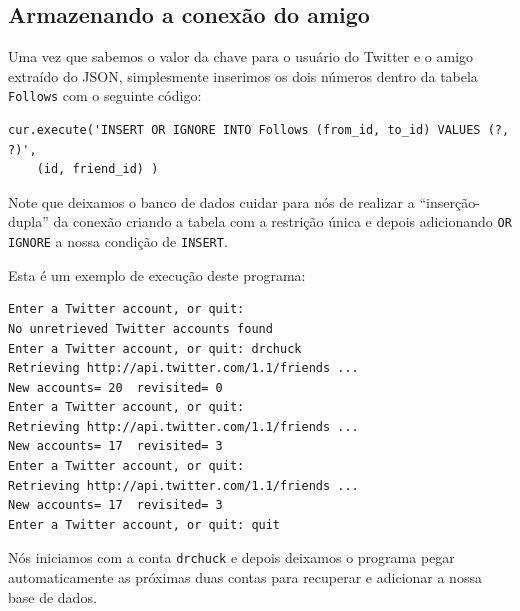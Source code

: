 \subsection{Armazenando a conexão do amigo}


Uma vez que sabemos o valor da chave para o usuário do Twitter e o amigo
extraído do JSON, simplesmente inserimos os dois números dentro da tabela
{\tt Follows} com o seguinte código:

\beforeverb
\begin{verbatim}
cur.execute('INSERT OR IGNORE INTO Follows (from_id, to_id) VALUES (?, ?)',
    (id, friend_id) )
\end{verbatim}
\afterverb
%
%
Note que deixamos o banco de dados cuidar para nós de realizar a
``inserção-dupla'' da conexão criando a tabela com a restrição única e depois
adicionando {\tt OR IGNORE} a nossa condição de {\tt INSERT}.

Esta é um exemplo de execução deste programa:

\beforeverb
\begin{verbatim}
Enter a Twitter account, or quit: 
No unretrieved Twitter accounts found
Enter a Twitter account, or quit: drchuck
Retrieving http://api.twitter.com/1.1/friends ...
New accounts= 20  revisited= 0
Enter a Twitter account, or quit: 
Retrieving http://api.twitter.com/1.1/friends ...
New accounts= 17  revisited= 3
Enter a Twitter account, or quit: 
Retrieving http://api.twitter.com/1.1/friends ...
New accounts= 17  revisited= 3
Enter a Twitter account, or quit: quit
\end{verbatim}
\afterverb
%

%
Nós iniciamos com a conta {\tt drchuck} e depois deixamos o programa pegar
automaticamente as próximas duas contas para recuperar e adicionar a nossa
base de dados.


